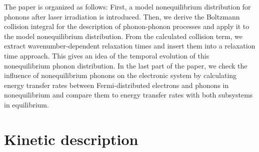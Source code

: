 \documentclass[ aps, prb, reprint, groupedaddress]{revtex4-1}
\begin{document}
The paper is organized as follows: First, a model nonequilibrium distribution for phonons after laser irradiation is introduced. Then, we derive the Boltzmann collision integral for the description of phonon-phonon 
processes and apply it to the model nonequilibrium distribution. From the calculated collision term, we extract wavenumber-dependent relaxation times and insert them into a relaxation time approach. This gives an idea 
of the temporal evolution of this nonequilibrium phonon distribution. In the last part of the paper, we check the influence of nonequilibrium phonons on the electronic system by calculating energy transfer rates 
between Fermi-distributed electrons and phonons in nonequilibrium and compare them to energy transfer rates with both subsystems in equilibrium.


\section{Kinetic description}
\end{document}
